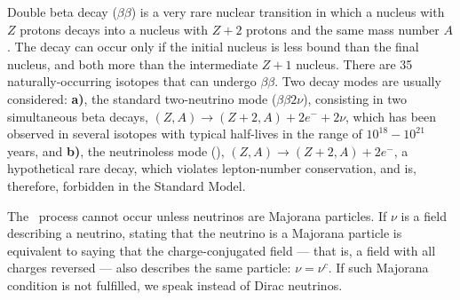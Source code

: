 Double beta decay ($\beta\beta$) is a very rare nuclear transition in which a nucleus with $Z$ protons decays into a nucleus with $Z + 2$ protons and the same mass number $A$. The decay can occur only if the initial nucleus is less bound than the final nucleus, and both more than the intermediate $Z + 1$ nucleus. There are 35 naturally-occurring isotopes that can undergo $\beta\beta$. Two decay modes are usually considered: {\bf a)}, the standard two-neutrino mode ($\beta\beta2\nu$), consisting in two simultaneous beta decays, 
$(Z,A) \rightarrow (Z + 2,A) + 2 e^- +2 \nu$, which has been observed in several isotopes with typical half-lives in the range of $10^{18}-10^{21}$ years, and 
{\bf b)}, the neutrinoless mode (\bbonu), 
$(Z,A) \rightarrow (Z +2, A) + 2 e^-$, a hypothetical rare decay, which violates lepton-number conservation, and is, therefore, forbidden in the Standard Model. 

The \bbonu\ process cannot occur unless neutrinos are Majorana particles. 
%
%
%
%
If $\nu$ is a field describing a neutrino, stating that the neutrino is a Majorana particle is equivalent to saying that the charge-conjugated field --- that is, a field with all charges reversed --- also describes the same particle: $\nu=\nu^c$. If such Majorana condition is not fulfilled, we speak instead of Dirac neutrinos. 

